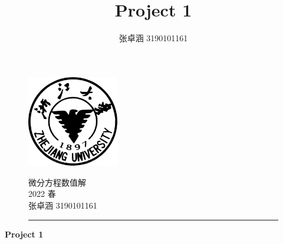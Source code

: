 \documentclass[a4paper,11.5pt,UTF8]{ctexart}
\title{Project 1}
\author{张卓涵 3190101161}
\begin{document}
\begin{figure}[t]
\begin{minipage}[h]{0.25\linewidth}
	\includegraphics[width=4.0cm]{./picture/ZJU2.jpeg}
\end{minipage}
\hfill
\begin{minipage}[h]{.7\linewidth}
	\begin{flushright}
			\Large{微分方程数值解
				\vspace{3mm}	\\
				   2022 春
				\vspace{3mm}	\\
				   张卓涵 \hspace{3mm}3190101161}
	\end{flushright}
\end{minipage}
\rule{\linewidth}{0.1em}
\end{figure}
\begin{center}
	\huge{\textbf{Project 1}}
\end{center}
\end{document}
